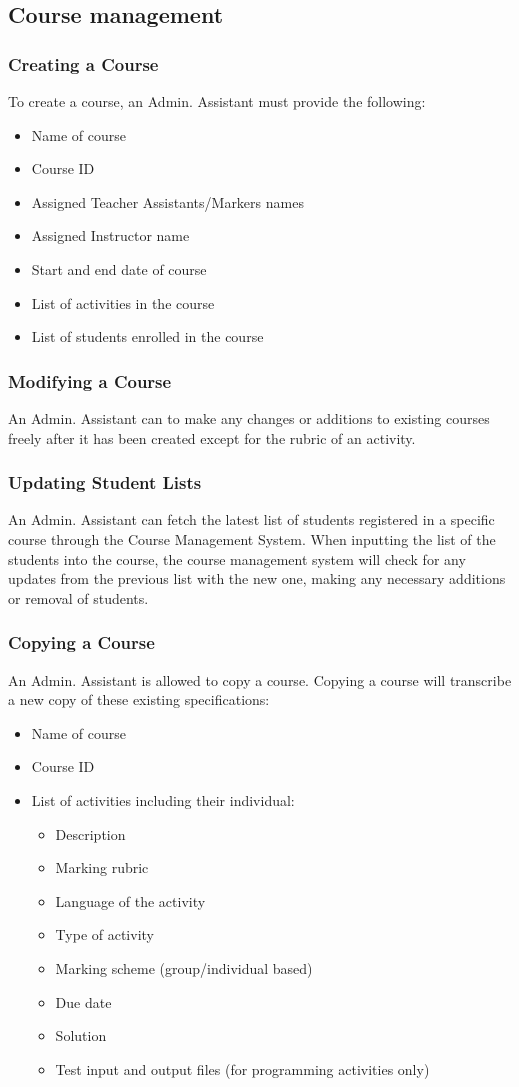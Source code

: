 \documentclass{article}
\begin{document}
\subsection {Course management}
\subsubsection{Creating a Course \label{courseCreation}}
To create a course, an Admin. Assistant must provide the following:
\begin{itemize}
	\item Name of course
	\item Course ID
	\item Assigned Teacher Assistants/Markers names
	\item Assigned Instructor name
	\item Start and end date of course
	\item List of activities in the course
	\item List of students enrolled in the course
\end{itemize}
\subsubsection{Modifying a Course}
An Admin. Assistant can to make any changes or additions to existing courses
freely after it has been created except for the rubric of an activity.
\subsubsection{Updating Student Lists}
An Admin. Assistant can fetch the latest list of students registered in a
specific course through the Course Management System.
When inputting the list of the students into the course, the course management
system will check for any updates from the previous list with the new one,
making any necessary additions or removal of students.
\subsubsection{Copying a Course}
An Admin. Assistant is allowed to copy a course. Copying a course will transcribe a new copy of these existing specifications:
\begin{itemize}
  \item Name of course
  \item Course ID
  \item List of activities including their individual:
    \begin{itemize}
    \item Description
    \item Marking rubric
    \item Language of the activity
    \item Type of activity
    \item Marking scheme (group/individual based)
    \item Due date
    \item Solution
    \item Test input and output files (for programming activities only)
    \end {itemize}
\end {itemize}
\end{document}
